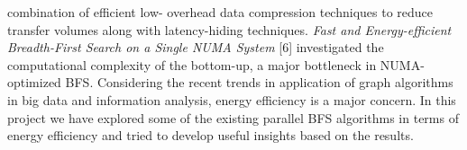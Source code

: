 combination of efficient low- overhead data compression techniques to
reduce transfer volumes along with latency-hiding techniques.\newline
\emph{Fast and Energy-efficient Breadth-First Search on a Single NUMA
System} [6] investigated the computational complexity of the
bottom-up, a major bottleneck in NUMA-optimized BFS.\newline
Considering the recent trends in application of graph algorithms in
big data and information analysis, energy efficiency is a major
concern. In this project we have explored some of the existing
parallel BFS algorithms in terms of energy efficiency and tried to
develop useful insights based on the results.
